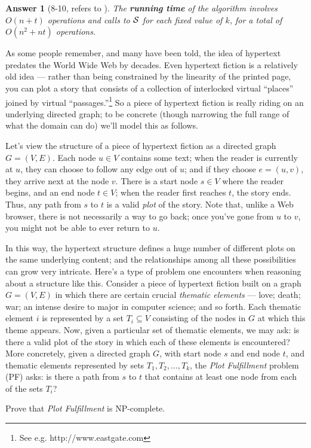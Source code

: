 \documentclass[11pt]{article}
\theoremstyle{numberplain}
\theoremstyle{nonumberplain}
\newtheorem{ans}{Answer}
\newcommand{\0}{{\mathbf{0}}}
\begin{document}
\begin{ans}[8-10, refers to \cite{solcornell}]
The \textbf{running time} of the algorithm involves $O(n + t)$ operations and calls
to $\cal S$ for each fixed value of $k$, for a total of $O(n^2 + nt)$
operations.
\end{ans}

\begin{ques}[8-11]
As some people remember, and many have been told,
the idea of hypertext predates the World Wide Web
by decades.
Even hypertext fiction is a relatively old idea ---
rather than being constrained by the linearity of the printed page,
you can plot a story that consists of a collection
of interlocked virtual ``places''
joined by virtual ``passages.''\footnote{See
e.g. http://www.eastgate.com}
So a piece of hypertext fiction is really riding on
an underlying directed graph; to be concrete
(though narrowing the full range of what the domain can do)
we'll model this as follows.

Let's view the structure of a piece of hypertext fiction as a
directed graph $G = (V,E)$.
Each node $u \in V$ contains some text;
when the reader is currently at $u$, they
can choose to follow any edge out of $u$; and if they choose
$e = (u,v)$, they arrive next at the node $v$.
There is a start node $s \in V$ where the reader begins,
and an end node $t \in V$; when the reader first reaches $t$,
the story ends.
Thus, any path from $s$ to $t$ is a valid {\em plot} of the story.
Note that, unlike a Web browser, there is not necessarily a way to go back;
once you've gone from $u$ to $v$, you might not be able to ever
return to $u$.

In this way, the hypertext structure defines a huge number
of different plots on the same underlying content;
and the relationships among all these possibilities can grow very intricate.
Here's a type of problem one encounters when
reasoning about a structure like this.
Consider a piece of hypertext fiction built on a graph $G = (V,E)$
in which there are certain crucial {\em thematic elements} ---
love; death; war; an intense desire to major in computer science;
and so forth.
Each thematic element $i$ is represented by a set $T_i \subseteq V$
consisting of the nodes in $G$ at which this theme appears.
Now, given a particular set of thematic elements,
we may ask: is there a valid plot of the story in which each
of these elements is encountered?
More concretely, given a directed graph $G$, with start node $s$
and end node $t$, and thematic elements
represented by sets $T_1, T_2, \ldots, T_k$,
the {\em Plot Fulfillment} problem (PF) asks:
is there a path from $s$ to $t$ that contains
at least one node from each of the sets $T_i$?

Prove that {\em Plot Fulfillment} is NP-complete.
\end{ques}
\end{document}

